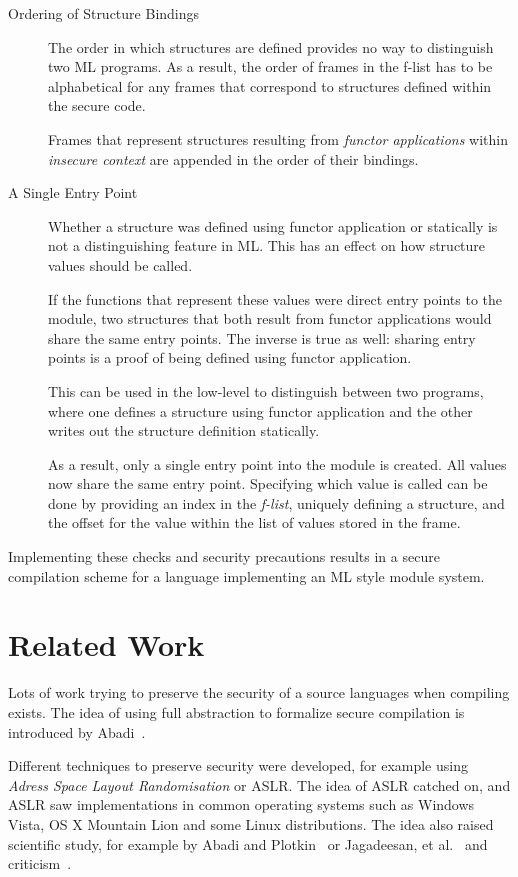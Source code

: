 \documentclass[11pt]{article}
\begin{document}
\begin{description}
\item[Ordering of Structure Bindings]
The order in which structures are defined provides no way to distinguish two ML programs.
As a result, the order of frames in the f-list has to be alphabetical for any frames that correspond to structures defined within the secure code.

Frames that represent structures resulting from \emph{functor applications} within \emph{insecure context} are appended in the order of their bindings.

\item[A Single Entry Point]
Whether a structure was defined using functor application or statically is not a distinguishing feature in ML.
This has an effect on how structure values should be called.

If the functions that represent these values were direct entry points to the module, two structures that both result from functor applications would share the same entry points.
The inverse is true as well: sharing entry points is a proof of being defined using functor application.

This can be used in the low-level to distinguish between two programs, where one defines a structure using functor application and the other writes out the structure definition statically.

As a result, only a single entry point into the module is created. 
All values now share the same entry point.
Specifying which value is called can be done by providing an index in the \emph{f-list}, uniquely defining a structure, and the offset for the value within the list of values stored in the frame.
\end{description}

Implementing these checks and security precautions results in a secure compilation scheme for a language implementing an ML style module system.

\section{Related Work}
Lots of work trying to preserve the security of a source languages when compiling exists.
The idea of using full abstraction to formalize secure compilation is introduced by Abadi~\cite{Abadi}.

Different techniques to preserve security were developed, for example using \emph{Adress Space Layout Randomisation} or ASLR.%
The idea of ASLR catched on, and ASLR saw implementations in common operating systems such as Windows Vista, OS X Mountain Lion and some Linux distributions. 
The idea also raised scientific study, for example by Abadi and Plotkin~\cite{AbadiASLR} or Jagadeesan, et al.~\cite{Jagadeesan} and criticism~\cite{Shacham:2004:EAR:1030083.1030124,Strackx:2009:BMS:1519144.1519145}.
\end{document}
